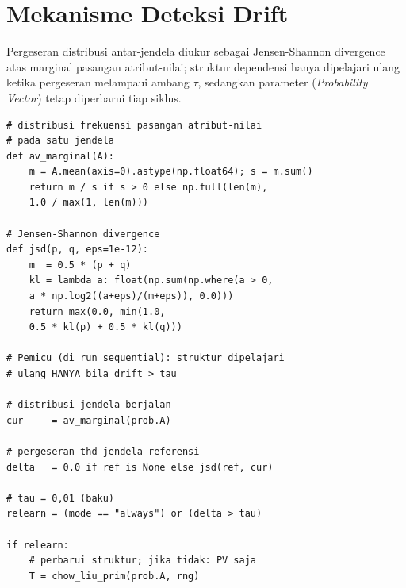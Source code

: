 \section{Mekanisme Deteksi Drift}

Pergeseran distribusi antar-jendela diukur sebagai Jensen-Shannon divergence atas marginal pasangan atribut-nilai; struktur dependensi hanya dipelajari ulang ketika pergeseran melampaui ambang $\tau$, sedangkan parameter (\textit{Probability Vector}) tetap diperbarui tiap siklus.

\begin{verbatim}
# distribusi frekuensi pasangan atribut-nilai 
# pada satu jendela
def av_marginal(A):     
    m = A.mean(axis=0).astype(np.float64); s = m.sum()
    return m / s if s > 0 else np.full(len(m), 
    1.0 / max(1, len(m)))

# Jensen-Shannon divergence
def jsd(p, q, eps=1e-12):                       
    m  = 0.5 * (p + q)
    kl = lambda a: float(np.sum(np.where(a > 0, 
    a * np.log2((a+eps)/(m+eps)), 0.0)))
    return max(0.0, min(1.0, 
    0.5 * kl(p) + 0.5 * kl(q)))

# Pemicu (di run_sequential): struktur dipelajari 
# ulang HANYA bila drift > tau

# distribusi jendela berjalan
cur     = av_marginal(prob.A)

# pergeseran thd jendela referensi
delta   = 0.0 if ref is None else jsd(ref, cur)

# tau = 0,01 (baku)
relearn = (mode == "always") or (delta > tau)   

if relearn:
    # perbarui struktur; jika tidak: PV saja
    T = chow_liu_prim(prob.A, rng)              
\end{verbatim}

